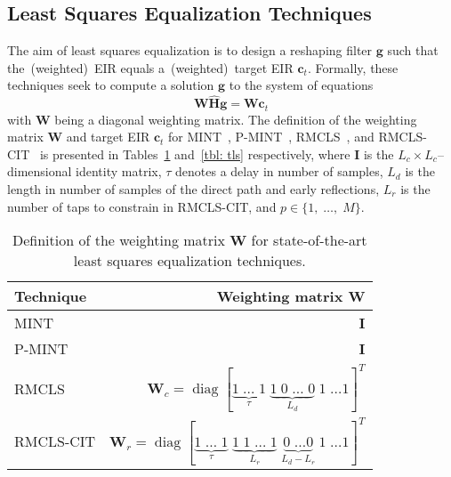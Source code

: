 \documentclass[11pt,draftcls,onecolumn]{IEEEtran}
\DeclareMathOperator{\diag}{diag}
\begin{document}
\subsection{Least Squares Equalization Techniques}
The aim of least squares equalization is to design a reshaping filter $\mathbf{g}$ such that the~(weighted)~EIR equals a~(weighted)~target EIR $\mathbf{c}_t$. 
Formally, these techniques seek to compute a solution $\mathbf{g}$ to the system of equations
\begin{equation}
  \label{eq: lsg}
\boxed{\mathbf{W}\hat{\mathbf{H}}\mathbf{g} = \mathbf{W}\mathbf{c}_t}
\end{equation}
with $\mathbf{W}$ being a diagonal weighting matrix.
The definition of the weighting matrix $\mathbf{W}$ and target EIR $\mathbf{c}_t$ for MINT~\cite{Miyoshi_ITASS_1988}, P-MINT~\cite{Kodrasi_ITASLP_2013}, RMCLS~\cite{Zhang_IWAENC_2010}, and RMCLS-CIT~\cite{Lim_IWAENC_2012} is presented in Tables~\ref{tbl: wls} and~\ref{tbl: tls} respectively, where $\mathbf{I}$ is the $L_c \times L_c$--dimensional identity matrix, $\tau$ denotes a delay in number of samples, $L_d$ is the length in number of samples of the direct path and early reflections, $L_r$ is the number of taps to constrain in RMCLS-CIT, and $p \in \{1, \; \ldots, \; M \}$.
\begin{table}[b!]
  \centering
  \caption{Definition of the weighting matrix $\mathbf{W}$ for state-of-the-art least squares equalization techniques.}
  \label{tbl: wls}
  \begin{tabular}{|l|r|}
    \hline
    Technique & Weighting matrix $\mathbf{W}$ \\
    \hline
     MINT & $\mathbf{I}$ \\
    \hline
    P-MINT & $\mathbf{I}$ \\
    \hline
    RMCLS & $\mathbf{W}_c = {\diag}[\underbrace{1 \; \ldots \; 1}_{\tau} \; \underbrace{1 \; 0 \; \ldots \; 0}_{L_d} \; 1 \; \ldots 1]^{T}$\\
    \hline
    RMCLS-CIT & $\mathbf{W}_{r} = {\diag} [\underbrace{1 \; \ldots \; 1}_{\tau} \; \underbrace{1 \; 1 \; \ldots \; 1}_{L_{r}} \; \underbrace{0 \; \ldots 0}_{L_d-L_{r}} \; 1 \; \ldots 1]^{T}$\\
    \hline
  \end{tabular}
\end{table}
\end{document}
